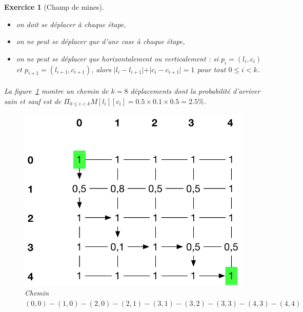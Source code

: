 \documentclass{article}
\theoremstyle{exostyle}
\newtheorem{exo}{Exercice}
\theoremstyle{partiestyle}
\theoremstyle{questionstyle}
\begin{document}
\begin{exo}[Champ de mines]
    \begin{itemize}
        \item on doit se déplacer à chaque étape,
        \item on ne peut se déplacer que d'une case à chaque étape,
        \item on ne peut se déplacer que horizontalement ou verticalement : si $p_i = (l_i, c_i)$ et $p_{i+1} = (l_{i+1}, c_{i+1})$, alors $\vert l_{i}-l_{i+1}\vert +\vert c_{i}-c_{i+1}\vert = 1$ pour tout $0\leq i < k$.

    \end{itemize}

\paragraph{} La figure~\ref{champ_chemin} montre un chemin de $k=8$ déplacements dont la probabilité d'arriver sain et sauf est de $\Pi_{0\leq i < k}M[l_i][c_i] = 0.5\times 0.1\times 0.5=2.5\%$.
    \begin{figure}[h]
        \begin{center}
        \includegraphics[scale=.5]{champ_mines_chemin}
        \end{center}
        \caption{Chemin $(0, 0)-(1, 0)-(2, 0)-(2, 1)-(3, 1)-(3, 2)-(3, 3)-(4, 3)-(4, 4)$\label{champ_chemin}}
    \end{figure}


\end{exo}
\end{document}
